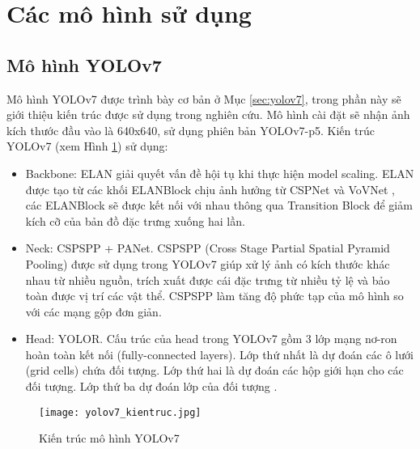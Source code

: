 \documentclass[../the.tex]{subfiles}
\begin{document}
\section{Các mô hình sử dụng}
\label{sec:model}
\subsection{Mô hình YOLOv7}
{\fontsize{13}{12} \selectfont

	Mô hình YOLOv7 được trình bày cơ bản ở Mục \ref{sec:yolov7}, trong phần này sẽ giới thiệu kiến trúc được sử dụng trong nghiên cứu. Mô hình cài đặt sẽ nhận ảnh kích thước đầu vào là 640x640, sử dụng phiên bản YOLOv7-p5. Kiến trúc YOLOv7 (xem Hình \ref{fig:yolov7_kientruc}) sử dụng:
	\begin{itemize}
		\item Backbone: ELAN giải quyết vấn đề hội tụ khi thực hiện model scaling. ELAN được tạo từ các khối ELANBlock chịu ảnh hưởng từ CSPNet \cite{wang2019cspnet} và VoVNet \cite{lee2019energy}, các ELANBlock sẽ được kết nối với nhau thông qua Transition Block để giảm kích cỡ của bản đồ đặc trưng xuống hai lần.
		\item Neck: CSPSPP + PANet. CSPSPP (Cross Stage Partial Spatial Pyramid Pooling) được sử dụng trong YOLOv7 giúp xử lý ảnh có kích thước khác nhau từ nhiều nguồn, trích xuất được cái đặc trưng từ nhiều tỷ lệ và bảo toàn được vị trí các vật thể. CSPSPP làm tăng độ phức tạp của mô hình so với các mạng gộp đơn giản.
		\item Head: YOLOR. Cấu trúc của head trong YOLOv7
		      gồm 3 lớp mạng nơ-ron hoàn toàn kết nối
		      (fully-connected layers). Lớp thứ nhất
		      là dự đoán các ô lưới (grid cells) chứa đối
		      tượng. Lớp thứ hai là dự đoán các hộp giới hạn cho các đối tượng. Lớp thứ ba dự đoán lớp của đối tượng \cite{cachuayol7}.
	\end{itemize}

}

\begin{figure}[H]
	\centering
	\texttt{[image: yolov7\_kientruc.jpg]}
	\caption{Kiến trúc mô hình YOLOv7}
	\label{fig:yolov7_kientruc}
\end{figure}
\end{document}
